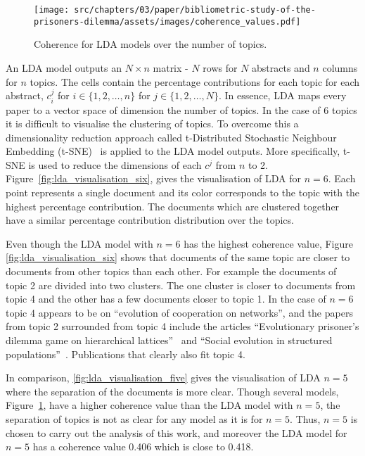 \begin{figure}[!hbtp]
    \centering
    \texttt{[image: src/chapters/03/paper/bibliometric-study-of-the-prisoners-dilemma/assets/images/coherence\_values.pdf]}
    \caption{Coherence for LDA models over the number of topics.}
    \label{fig:coherence_value_over_number_of_topcis}
\end{figure}

An LDA model outputs an \(N \times n\) matrix - \(N\) rows for \(N\)
abstracts and \(n\) columns for \(n\) topics. The cells contain the percentage
contributions for each topic for each abstract, \(c_i^ j\) for
\(i \in \{1, 2, \dots, n\}\) for \(j \in \{1, 2, \dots, N\}\). In essence,
LDA maps every paper to a vector space of dimension the number of topics. In the case
of 6 topics it is difficult to visualise the clustering of topics. To overcome
this a dimensionality reduction approach called t-Distributed Stochastic Neighbour Embedding
(t-SNE)~\cite{Maaten2008} is applied to the LDA model outputs. More specifically,
t-SNE is used to reduce the dimensions of each \(c^j\) from \(n\) to 2.
Figure~\ref{fig:lda_visualisation_six}, gives the visualisation of LDA for \(n=6\).
Each point represents a single document and its color corresponds to the topic
with the highest percentage contribution. The documents which are clustered
together have a similar percentage contribution distribution over the topics.

Even though the LDA model with \(n=6\) has the highest coherence value, Figure
\ref{fig:lda_visualisation_six} shows that documents of the same topic are
closer to documents from other topics than each other. For example the documents
of topic 2 are divided into two clusters. The one cluster is closer to documents
from topic 4 and the other has a few documents closer to topic 1. In the case of \(n=6\)
topic 4 appears to be on ``evolution of cooperation on networks'', and the
papers from topic 2 surrounded from topic 4 include the articles
``Evolutionary prisoner's dilemma game on hierarchical lattices''~\cite{Vukov2005}
and ``Social evolution in structured populations''~\cite{Debarre2014}. Publications
that clearly also fit topic 4.

In comparison,
\ref{fig:lda_visualisation_five} gives the visualisation of LDA \(n=5\) where
the separation of the documents is more clear. Though
several models, Figure~\ref{fig:coherence_value_over_number_of_topcis}, have a
higher coherence value than the LDA model with \(n=5\), the separation
of topics is not as clear for any model as it is for \(n=5\). Thus, \(n=5\) is
chosen to carry out the analysis of this work, and moreover the LDA model for
\(n=5\) has a coherence value 0.406 which is close to 0.418.

